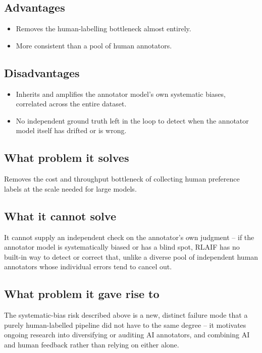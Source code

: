 \documentclass[11pt]{article}
\begin{document}
\subsection{Advantages}
\begin{itemize}
  \item Removes the human-labelling bottleneck almost entirely.
  \item More consistent than a pool of human annotators.
\end{itemize}

\subsection{Disadvantages}
\begin{itemize}
  \item Inherits and amplifies the annotator model's own systematic biases,
  correlated across the entire dataset.
  \item No independent ground truth left in the loop to detect when the
  annotator model itself has drifted or is wrong.
\end{itemize}

\subsection{What problem it solves}
Removes the cost and throughput bottleneck of collecting human preference labels
at the scale needed for large models.

\subsection{What it cannot solve}
It cannot supply an independent check on the annotator's own judgment -- if the
annotator model is systematically biased or has a blind spot, RLAIF has no
built-in way to detect or correct that, unlike a diverse pool of independent
human annotators whose individual errors tend to cancel out.

\subsection{What problem it gave rise to}
The systematic-bias risk described above is a new, distinct failure mode that a
purely human-labelled pipeline did not have to the same degree -- it motivates
ongoing research into diversifying or auditing AI annotators, and combining AI
and human feedback rather than relying on either alone.
\end{document}
